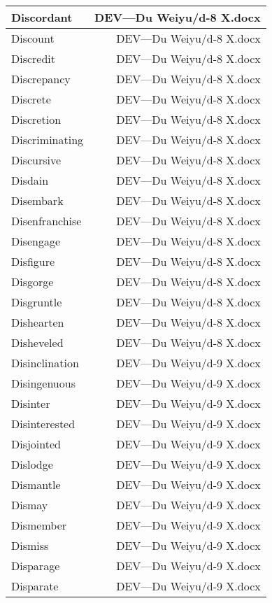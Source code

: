 \documentclass{article}
\begin{document}
\begin{center}
\begin{longtable}{|l|r|}
\hline
Discordant  &  DEV---Du Weiyu/d-8 X.docx\\  
\hline
Discount  &  DEV---Du Weiyu/d-8 X.docx\\  
\hline
Discredit  &  DEV---Du Weiyu/d-8 X.docx\\  
\hline
Discrepancy  &  DEV---Du Weiyu/d-8 X.docx\\  
\hline
Discrete  &  DEV---Du Weiyu/d-8 X.docx\\  
\hline
Discretion  &  DEV---Du Weiyu/d-8 X.docx\\  
\hline
Discriminating  &  DEV---Du Weiyu/d-8 X.docx\\  
\hline
Discursive  &  DEV---Du Weiyu/d-8 X.docx\\  
\hline
Disdain  &  DEV---Du Weiyu/d-8 X.docx\\  
\hline
Disembark  &  DEV---Du Weiyu/d-8 X.docx\\  
\hline
Disenfranchise  &  DEV---Du Weiyu/d-8 X.docx\\  
\hline
Disengage  &  DEV---Du Weiyu/d-8 X.docx\\  
\hline
Disfigure  &  DEV---Du Weiyu/d-8 X.docx\\  
\hline
Disgorge  &  DEV---Du Weiyu/d-8 X.docx\\  
\hline
Disgruntle  &  DEV---Du Weiyu/d-8 X.docx\\  
\hline
Dishearten  &  DEV---Du Weiyu/d-8 X.docx\\  
\hline
Disheveled  &  DEV---Du Weiyu/d-8 X.docx\\  
\hline
Disinclination  &  DEV---Du Weiyu/d-9 X.docx\\  
\hline
Disingenuous  &  DEV---Du Weiyu/d-9 X.docx\\  
\hline
Disinter  &  DEV---Du Weiyu/d-9 X.docx\\  
\hline
Disinterested  &  DEV---Du Weiyu/d-9 X.docx\\  
\hline
Disjointed  &  DEV---Du Weiyu/d-9 X.docx\\  
\hline
Dislodge  &  DEV---Du Weiyu/d-9 X.docx\\  
\hline
Dismantle  &  DEV---Du Weiyu/d-9 X.docx\\  
\hline
Dismay  &  DEV---Du Weiyu/d-9 X.docx\\  
\hline
Dismember  &  DEV---Du Weiyu/d-9 X.docx\\  
\hline
Dismiss  &  DEV---Du Weiyu/d-9 X.docx\\  
\hline
Disparage  &  DEV---Du Weiyu/d-9 X.docx\\  
\hline
Disparate  &  DEV---Du Weiyu/d-9 X.docx\\  

\end{longtable}
\end{center}
\end{document}

